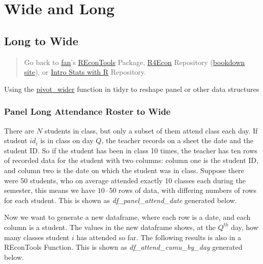 \documentclass[
]{book}
\begin{document}
\hypertarget{wide-and-long}{%
\section{Wide and Long}\label{wide-and-long}}

\hypertarget{long-to-wide}{%
\subsection{Long to Wide}\label{long-to-wide}}

\begin{quote}
Go back to \href{http://fanwangecon.github.io/CodeDynaAsset/}{fan}'s \href{https://fanwangecon.github.io/REconTools/}{REconTools} Package, \href{https://fanwangecon.github.io/R4Econ/}{R4Econ} Repository (\href{https://fanwangecon.github.io/R4Econ/bookdown}{bookdown site}), or \href{https://fanwangecon.github.io/Stat4Econ/}{Intro Stats with R} Repository.
\end{quote}

Using the \href{https://tidyr.tidyverse.org/reference/pivot_wider.html}{pivot\_wider} function in tidyr to reshape panel or other data structures

\hypertarget{panel-long-attendance-roster-to-wide}{%
\subsubsection{Panel Long Attendance Roster to Wide}\label{panel-long-attendance-roster-to-wide}}

There are \(N\) students in class, but only a subset of them attend class each day. If student \(id_i\) is in class on day \(Q\), the teacher records on a sheet the date and the student ID. So if the student has been in class 10 times, the teacher has ten rows of recorded data for the student with two columns: column one is the student ID, and column two is the date on which the student was in class. Suppose there were 50 students, who on average attended exactly 10 classes each during the semester, this means we have \(10 \cdot 50\) rows of data, with differing numbers of rows for each student. This is shown as \emph{df\_panel\_attend\_date} generated below.

Now we want to generate a new dataframe, where each row is a date, and each column is a student. The values in the new dataframe shows, at the \(Q^{th}\) day, how many classes student \(i\) has attended so far. The following results is also in a REconTools Function. This is shown as \emph{df\_attend\_cumu\_by\_day} generated below.
\end{document}
